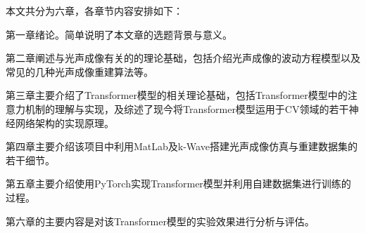 \label{sec:arrangement}

本文共分为六章，各章节内容安排如下：

第一章绪论。简单说明了本文章的选题背景与意义。

第二章阐述与光声成像有关的的理论基础，包括介绍光声成像的波动方程模型以及常见的几种光声成像重建算法等。

第三章主要介绍了Transformer模型的相关理论基础，包括Transformer模型中的注意力机制的理解与实现，及综述了现今将Transformer模型运用于CV领域的若干神经网络架构的实现原理。

第四章主要介绍该项目中利用MatLab及k-Wave搭建光声成像仿真与重建数据集的若干细节。

第五章主要介绍使用PyTorch实现Transformer模型并利用自建数据集进行训练的过程。

第六章的主要内容是对该Transformer模型的实验效果进行分析与评估。


